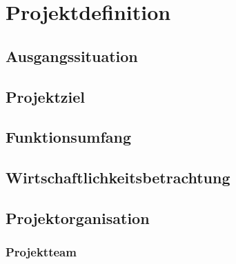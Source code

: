 
\chapter{Projektdefinition}
	
	\section{Ausgangssituation}
	
	\section{Projektziel}
	
	\section{Funktionsumfang}
	
	\section{Wirtschaftlichkeitsbetrachtung}
	
	\section{Projektorganisation}
		
		\subsection{Projektteam}
		
